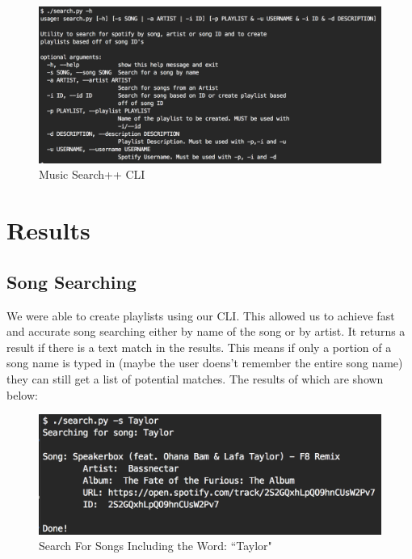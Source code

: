 \documentclass [letter,12pt] {article}
\begin{document}
    \begin{figure}[htp]
        \centering
        \includegraphics[width=\textwidth]{CLI_Help.png}
        \caption{Music Search++ CLI}
        \label{fig:searchcli}
    \end{figure}

\section{Results}
    \subsection{Song Searching}
        We were able to create playlists using our CLI. This allowed us to achieve fast and accurate song searching either by name of the song or by artist. It returns a result if there is a text match in the results. This means if only a portion of a song name is typed in (maybe the user doens't remember the entire song name) they can still get a list of potential matches. The results of which are shown below:
        
        \begin{figure}[htp]
            \centering
            \includegraphics[width=\textwidth]{Song_Taylor_Search.png}
            \caption{Search For Songs Including the Word: ``Taylor"}
            \label{fig:taylorsong}
        \end{figure}
    
\end{document}
